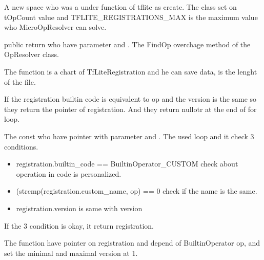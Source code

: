 A new space who was a under function of tflite as create. 
The class  set on tOpCount value and TFLITE\_REGISTRATIONS\_MAX is the maximum value who MicroOpResolver can solve. 

public return  who have parameter  and . The FindOp overchage method of the OpResolver class.

The function  is a chart of TfLiteRegistration and he can save data, is the lenght of the file.

If the registration builtin code is equivalent to op and the version is the same so they return the pointer of registration. 
And they return nullotr at the end of for loop. 

\begin{center}
    \label{Figure:MicroErrorRep}
\end{center}

The const  who have pointer with parameter  and . The  used loop  and it check 3 conditions. 

\begin{itemize}
    
    \item registration.builtin\_code == BuiltinOperator\_CUSTOM check about operation in code is personalized. 
    \item (strcmp(registration.custom\_name, op) == 0 check if the name is the same. 
    \item registration.version is same with version
    
\end{itemize}
If the 3 condition is okay, it return registration. 

\begin{center}
    \label{Figure:MicroErrorRep}
\end{center}

The function  have pointer on registration and depend of BuiltinOperator op, and set the minimal and maximal version at 1. 

